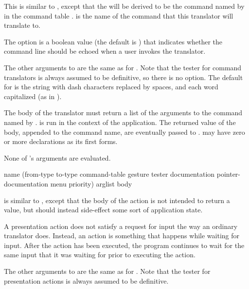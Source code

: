 This is similar to , except that the
 will be derived to be the command named by  in
the command table .   is the name of the
command that this translator will translate to.

The  option is a boolean value (the default is ) that
indicates whether the command line should be echoed when a user invokes the
translator.

The other arguments to  are the
same as for .  Note that the tester for
command translators is always assumed to be definitive, so there is no
 option. The default for  is
the string  with dash characters replaced by spaces, and each
word capitalized (as in ).

The body of the translator must return a list of the arguments to the command
named by .   is run in the context of the
application.  The returned value of the body, appended to the command name, are
eventually passed to .   may have zero or
more declarations as its first forms.

None of 's arguments are evaluated.


 {name
                                        (from-type to-type command-table
                                         \key gesture tester
                                              documentation pointer-documentation
                                              menu priority)
                                        arglist
                                        \body body}

 is similar to ,
except that the body of the action is not intended to return a value, but should
instead side-effect some sort of application state.

A presentation action does not satisfy a request for input the way an ordinary
translator does.  Instead, an action is something that happens while waiting for
input.  After the action has been executed, the program continues to wait for
the same input that it was waiting for prior to executing the action.

The other arguments to  are the same as for
.  Note that the tester for presentation
actions is always assumed to be definitive.


